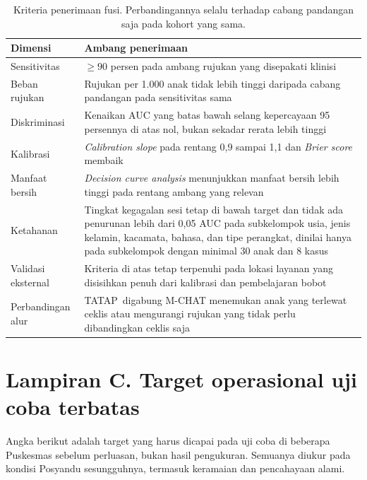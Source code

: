 \documentclass[10pt,letterpaper]{article}
\newcommand{\produk}{TATAP}
\begin{document}
\begin{table}[H]
\centering
\small
\caption{Kriteria penerimaan fusi. Perbandingannya selalu terhadap cabang pandangan saja
pada kohort yang sama.}
\label{tab:fusi}
\begin{tabular}{@{}p{}p{}@{}}
\toprule
\textbf{Dimensi} & \textbf{Ambang penerimaan} \\
\midrule
Sensitivitas & $\geq 90$ persen pada ambang rujukan yang disepakati klinisi \\
Beban rujukan & Rujukan per 1.000 anak tidak lebih tinggi daripada cabang pandangan pada sensitivitas sama \\
Diskriminasi & Kenaikan AUC yang batas bawah selang kepercayaan 95 persennya di atas nol, bukan sekadar rerata lebih tinggi \\
Kalibrasi & \textit{Calibration slope} pada rentang 0,9 sampai 1,1 dan \textit{Brier score} membaik \\
Manfaat bersih & \textit{Decision curve analysis} menunjukkan manfaat bersih lebih tinggi pada rentang ambang yang relevan \\
Ketahanan & Tingkat kegagalan sesi tetap di bawah target dan tidak ada penurunan lebih dari 0,05 AUC pada subkelompok usia, jenis kelamin, kacamata, bahasa, dan tipe perangkat, dinilai hanya pada subkelompok dengan minimal 30 anak dan 8 kasus \\
Validasi eksternal & Kriteria di atas tetap terpenuhi pada lokasi layanan yang disisihkan penuh dari kalibrasi dan pembelajaran bobot \\
Perbandingan alur & \produk\ digabung M-CHAT menemukan anak yang terlewat ceklis atau mengurangi rujukan yang tidak perlu dibandingkan ceklis saja \\
\bottomrule
\end{tabular}
\end{table}

\newpage
\section*{Lampiran C. Target operasional uji coba terbatas}

Angka berikut adalah target yang harus dicapai pada uji coba di beberapa Puskesmas sebelum
perluasan, bukan hasil pengukuran. Semuanya diukur pada kondisi Posyandu sesungguhnya,
termasuk keramaian dan pencahayaan alami.
\end{document}
